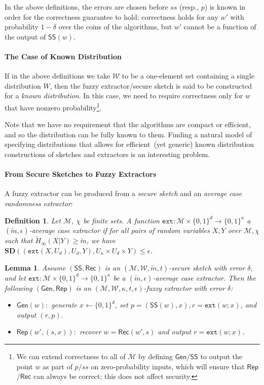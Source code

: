 \documentclass[11pt]{article}
\newcommand{\class}[1]{{\ensuremath{\mathsf{#1}}}}
\newcommand{\gen}{\ensuremath{\class{Gen}}\xspace}
\newcommand{\rep}{\ensuremath{\class{Rep}}\xspace}
\newcommand{\sketch}{\ensuremath{\class{SS}}\xspace}
\newcommand{\rec}{\ensuremath{\class{Rec}}\xspace}
\newcommand{\zo}{\ensuremath{\{0, 1\}}}
\newcommand{\ext}{\ensuremath{\mathtt{ext}}}
\newcommand{\sd}{\ensuremath{\mathbf{SD}}}
\newtheorem{lemma}[theorem]{Lemma}
\newtheorem{definition}[theorem]{Definition}
\begin{document}
\noindent
In the above definitions, the errors are chosen before $ss$ (resp., $p$) is known in order for the correctness guarantee to hold: correctness holds for any $w'$ with probability $1-\delta$ over the coins of the algorithms, but $w'$ cannot be a function of the output of  $\sketch(w)$. 


\paragraph{The Case of Known Distribution}
If in the above definitions we take $\mathcal{W}$ to be a one-element set containing a single distribution $W$, then the fuzzy extractor/secure sketch is said to be constructed for a \emph{known distribution}.  In this case, we need to require correctness only for $w$ that have nonzero probability\footnote{We can extend correctness to all of $\mathcal{M}$ by defining $\gen$/$\sketch$ to output the point $w$ as part of $p/ss$ on zero-probability inputs, which will ensure that $\rep$/$\rec$ can always be correct; this does not affect security.}.

Note that we have no requirement that the algorithms are compact or efficient, and so the distribution can be fully known to them. Finding a natural model of specifying distributions that allows for efficient~(yet generic) known distribution constructions of sketches and extractors is an interesting problem.  

\paragraph{From Secure Sketches to Fuzzy Extractors}
A fuzzy extractor can be produced from a \emph{secure sketch} and an \emph{average case randomness extractor}:

\begin{definition}
Let $\mathcal{M}$, $\chi$ be finite sets.
A function $\ext: \mathcal{M}\times \{0,1\}^d \rightarrow \{0,1\}^\kappa$ a \emph{$(\tilde{m}, \epsilon)$-average case extractor} if for all pairs
of random variables $X, Y$ over $\mathcal{M}, \chi$ such that
$\tilde{H}_\infty(X|Y) \ge \tilde{m}$, we have $\sd((\ext(X, U_d), U_d, Y), U_\kappa\times
U_d \times Y) \le \epsilon$.
\end{definition}

\begin{lemma}
\label{lem:fuzzy ext construction}
Assume $(\sketch, \rec)$ is an $(\mathcal{M}, \mathcal{W}, \tilde{m}, t)$-secure sketch with error $\delta$, and let $\ext:\mathcal{M}\times \zo^d \rightarrow \zo^\kappa$ be a $(\tilde{m}, \epsilon)$-average case extractor.  Then the following $(\gen, \rep)$ is an $(\mathcal{M}, \mathcal{W}, \kappa, t, \epsilon)$-fuzzy extractor with error $\delta$:
\begin{itemize}
\item $\gen(w):$ generate $x\leftarrow \zo^d$, set $p=(\sketch(w), x), r=\ext(w;x)$, and output $(r,p)$.
\item $\rep(w', (s, x)):$ recover $w=\rec(w',s)$ and output $r=\ext(w;x)$.
\end{itemize}
\end{lemma}
\end{document}
